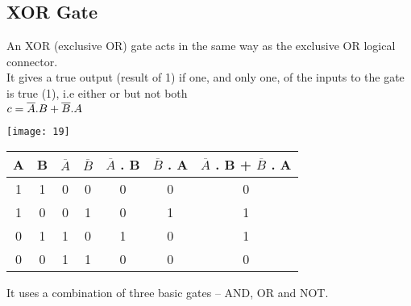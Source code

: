 \documentclass{article}
\begin{document}
\subsection{XOR Gate}
An XOR (exclusive OR) gate acts in the same way as the exclusive OR logical connector. \\
It gives a true output (result of 1) if one, and only one, of the inputs to the gate is true (1), i.e either or but not both \\
\color{red}$\\ c = \overline{A}.B + \overline{B}.A$ \\ \color{black}
\begin{center} 
	\texttt{[image: 19]}
\end{center}
\begin{table}[h!]
	\begin{center}
		\begin{tabular}{c|c|c|c|c|c|c}
			\textbf{A} & \textbf{B} & \textbf{$\overline{A}$} & \textbf{$\overline{B}$} & \textbf{$\overline{A}$ . B} & \textbf{$\overline{B}$ . A} & \textbf{$\overline{A}$ . B} + \textbf{$\overline{B}$ . A}\\
			\hline
			1 & 1 & 0 & 0 & 0 & 0 & 0\\
			\hline
			1 & 0 & 0 & 1 & 0 & 1 & 1\\
			\hline
			0 & 1 & 1 & 0 & 1 & 0 & 1\\
			\hline
			0 & 0 & 1 & 1 & 0 & 0 & 0\\
			\hline
		\end{tabular}
	\end{center}
\end{table} 
\color{red}It uses a combination of three basic gates – AND, OR and NOT. \\ \color{black}
\end{document}
